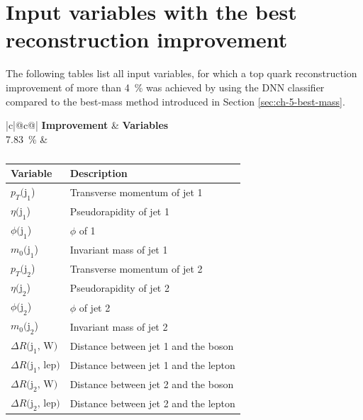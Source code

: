 \chapter{Input variables with the best reconstruction improvement}
The following tables list all input variables, for which a top quark reconstruction improvement of more than \SI{4}{\%} was achieved by using the DNN classifier compared to the best-mass method introduced in Section \ref{sec:ch-5-best-mass}.

\begin{table}[h]
    \centering
    \label{tab:app_vars_1}
    \caption{}
    \begin{tabular}{ |c|@{}c@{}| }
        \hline
        \textbf{Improvement} & \textbf{Variables}\\
        \hline
        \SI{7.83}{\%} & 
        \begin{tabular}{ll}
            \hline
            Variable & Description\\
            \hline
            $p_T\text{(j}_\text{1}$) & Transverse momentum of jet 1\\
            $\eta\text{(j}_\text{1}$) & Pseudorapidity of jet 1\\
            $\phi\text{(j}_\text{1}$) & $\phi$ of 1\\
            $m_0\text{(j}_\text{1}$) & Invariant mass of jet 1\\

            $p_T\text{(j}_\text{2}$) & Transverse momentum of jet 2\\
            $\eta\text{(j}_\text{2}$) & Pseudorapidity of jet 2\\
            $\phi\text{(j}_\text{2}$) & $\phi$ of jet 2\\
            $m_0\text{(j}_\text{2}$) & Invariant mass of jet 2\\

            $\Delta R \text{(j}_\text{1}\text{, W)}$ & Distance between jet 1 and the \PWplus boson\\
            $\Delta R \text{(j}_\text{1}\text{, lep)}$ & Distance between jet 1 and the lepton\\
            $\Delta R \text{(j}_\text{2}\text{, W)}$ & Distance between jet 2 and the \PWplus boson\\
            $\Delta R \text{(j}_\text{2}\text{, lep)}$ & Distance between jet 2 and the lepton\\
            \hline
        \end{tabular}\\
        \hline
    \end{tabular}
\end{table}

